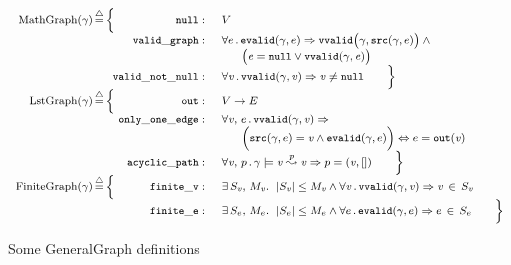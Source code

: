 \begin{figure}
\begin{equation*}
{\footnotesize
\begin{array}{r@{}c@{}c@{\!}rl}
        \mathrm{MathGraph}(\gamma)\,&\defeq&\,\Big\{&\mathtt{null}:&\; V\\
          &&&\mathtt{valid\_graph}:&\; \forall e\,.\,\mathtt{evalid}(\gamma, e) \Rightarrow
          \mathtt{vvalid}\big(\gamma, \mathtt{src}(\gamma, e)\big)\wedge \null \\
          &&&&\qquad \big(\m{e} = \mathtt{null} \vee \mathtt{vvalid}(\gamma, \m{e})\big)\\
          &&&\mathtt{valid\_not\_null}:&\; \forall \m{v}\,.\,\mathtt{vvalid}(\gamma, \m{v})
          \Rightarrow \m{v} \neq \mathtt{null} \qquad \Big\} \\
        \mathrm{LstGraph}(\gamma)\,&\defeq&\, \Big\{&\mathtt{out}:&\; V \rightarrow E\\
          &&&\mathtt{only\_one\_edge}:&\; \forall \m{v},\,e\,.\,
          \mathtt{vvalid}(\gamma, \m{v}) \Rightarrow \\
          &&&&\qquad \Big(\mathtt{src}(\gamma, e) =\m{v} \wedge
                \mathtt{evalid}(\gamma, e)\Big) \Leftrightarrow e = \mathtt{out}(\m{v})\\
          &&&\mathtt{acyclic\_path}:&\; \forall \m{v},\,p\,.\,
          \gamma |= \m{v} \overset{p}{\leadsto} \m{v} \Rightarrow p = (\m{v},[]) \qquad \Big\} \\
       	\mathrm{FiniteGraph}(\gamma)\,&\defeq&\, \Big\{&\mathtt{finite\_v}:&\;\exists\, S_\m{v},\, M_\m{v}.~\;\lvert S_\m{v}\rvert
          \leq M_\m{v} \wedge
          \forall \m{v}\,.\, \mathtt{vvalid}(\gamma,\m{v})\Rightarrow \m{v}\,\in\,S_\m{v}\\
          &&&\mathtt{finite\_e}:&\;\exists\, S_e,\, M_e.~\;\lvert S_e\rvert
          \leq M_e \wedge
          \forall e\,.\, \mathtt{evalid}(\gamma,e)\Rightarrow e\,\in\,S_e \qquad \Big\}
\end{array}}
\end{equation*}
\vspace{-1em}
\caption{Some GeneralGraph definitions}
\label{fig:gengraphdefs}
\vspace{-1.5em}

\end{figure} 